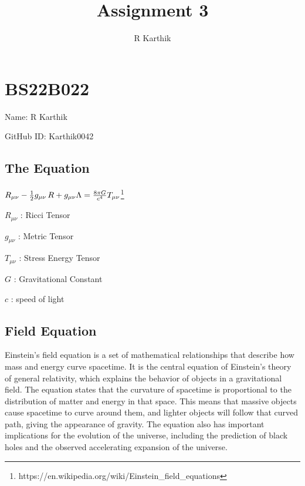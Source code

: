 \documentclass{article}
\title{Assignment 3}
\author{R Karthik}
\begin{document}
\maketitle



\section{BS22B022}
\vspace{2mm}
Name: R Karthik

\vspace{2mm}
GitHub ID: Karthik0042
\subsection{The Equation}
$R_{\mu \nu} - {1 \over 2}g_{\mu \nu}\,R + g_{\mu \nu} \Lambda = 
 {8 \pi G \over c^4} T_{\mu \nu}$\footnote{https://en.wikipedia.org/wiki/Einstein_field_equations}
 
\vspace{5mm} 
 $R_{\mu \nu}$ : Ricci Tensor
 
\vspace{2mm}
$g_{\mu \nu}$ : Metric Tensor

\vspace{2mm}
$T_{\mu \nu}$ : Stress Energy Tensor

\vspace{2mm}
$G$ : Gravitational Constant

\vspace{2mm}
$c$ : speed of light

\vspace{2mm}
\subsection{Field Equation}
Einstein's field equation is a set of mathematical relationships that describe how mass and energy curve spacetime. It is the central equation of Einstein's theory of general relativity, which explains the behavior of objects in a gravitational field. The equation states that the curvature of spacetime is proportional to the distribution of matter and energy in that space. This means that massive objects cause spacetime to curve around them, and lighter objects will follow that curved path, giving the appearance of gravity. The equation also has important implications for the evolution of the universe, including the prediction of black holes and the observed accelerating expansion of the universe.
\end{document}
